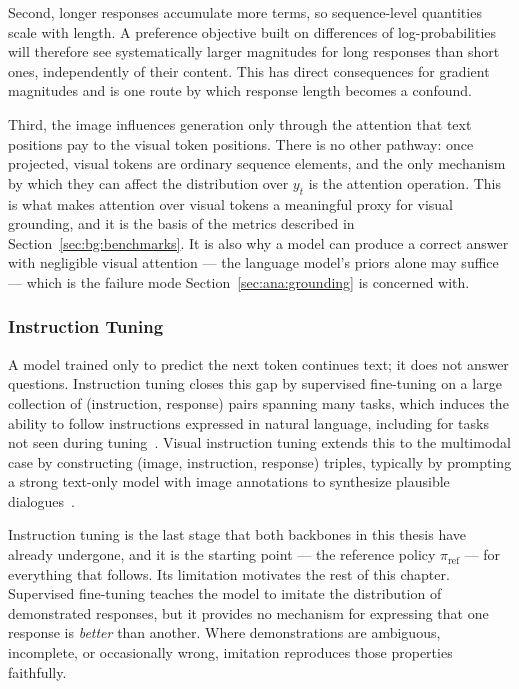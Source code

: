 Second, longer responses accumulate more terms, so sequence-level quantities scale with length. A preference objective built on differences of log-probabilities will therefore see systematically larger magnitudes for long responses than short ones, independently of their content. This has direct consequences for gradient magnitudes and is one route by which response length becomes a confound.

Third, the image influences generation only through the attention that text positions pay to the visual token positions. There is no other pathway: once projected, visual tokens are ordinary sequence elements, and the only mechanism by which they can affect the distribution over $y_t$ is the attention operation. This is what makes attention over visual tokens a meaningful proxy for visual grounding, and it is the basis of the metrics described in Section~\ref{sec:bg:benchmarks}. It is also why a model can produce a correct answer with negligible visual attention --- the language model's priors alone may suffice --- which is the failure mode Section~\ref{sec:ana:grounding} is concerned with.

\subsubsection{Instruction Tuning}

A model trained only to predict the next token continues text; it does not answer questions. Instruction tuning closes this gap by supervised fine-tuning on a large collection of (instruction, response) pairs spanning many tasks, which induces the ability to follow instructions expressed in natural language, including for tasks not seen during tuning~\cite{wei2022finetuned}. Visual instruction tuning extends this to the multimodal case by constructing (image, instruction, response) triples, typically by prompting a strong text-only model with image annotations to synthesize plausible dialogues~\cite{liu2023visual, dai2023instructblip}.

Instruction tuning is the last stage that both backbones in this thesis have already undergone, and it is the starting point --- the reference policy $\pi_{\text{ref}}$ --- for everything that follows. Its limitation motivates the rest of this chapter. Supervised fine-tuning teaches the model to imitate the distribution of demonstrated responses, but it provides no mechanism for expressing that one response is \emph{better} than another. Where demonstrations are ambiguous, incomplete, or occasionally wrong, imitation reproduces those properties faithfully.

